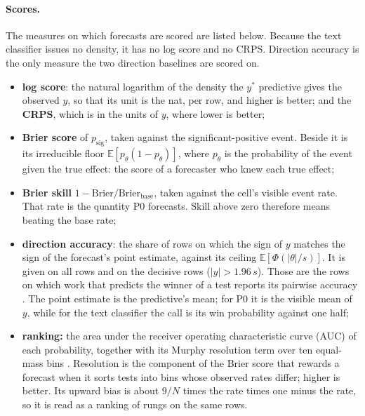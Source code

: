 \documentclass[sigconf,nonacm]{acmart}
\newcommand{\psig}{p_{\mathrm{sig}}}
\begin{document}
\paragraph{Scores.} The measures on which forecasts are scored are listed below. Because the text classifier issues no density, it has no log score and no CRPS. Direction accuracy is the only measure the two direction baselines are scored on.
\begin{itemize}
\item \textbf{log score}: the natural logarithm of the density the $y^\ast$ predictive gives the observed $y$, so that its unit is the nat, per row, and higher is better; and the \textbf{CRPS}, which is in the units of $y$, where lower is better;
\item \textbf{Brier score} of $\psig$, taken against the significant-positive event. Beside it is its irreducible floor $\mathbb{E}[p_\theta (1 - p_\theta)]$, where $p_\theta$ is the probability of the event given the true effect: the score of a forecaster who knew each true effect;
\item \textbf{Brier skill} $1 - \mathrm{Brier}/\mathrm{Brier}_{\mathrm{base}}$, taken against the cell's visible event rate. That rate is the quantity P0 forecasts. Skill above zero therefore means beating the base rate;
\item \textbf{direction accuracy}: the share of rows on which the sign of $y$ matches the sign of the forecast's point estimate, against its ceiling $\mathbb{E}[\Phi(|\theta|/s)]$. It is given on all rows and on the decisive rows ($|y| > 1.96\,s$). Those are the rows on which work that predicts the winner of a test reports its pairwise accuracy \cite{khimani2026finetuning}. The point estimate is the predictive's mean; for P0 it is the visible mean of $y$, while for the text classifier the call is its win probability against one half;
\item \textbf{ranking:} the area under the receiver operating characteristic curve (AUC) of each probability, together with its Murphy resolution term over ten equal-mass bins \cite{murphy1973vector}. Resolution is the component of the Brier score that rewards a forecast when it sorts tests into bins whose observed rates differ; higher is better. Its upward bias is about $9/N$ times the rate times one minus the rate, so it is read as a ranking of rungs on the same rows.
\end{itemize}
\end{document}
